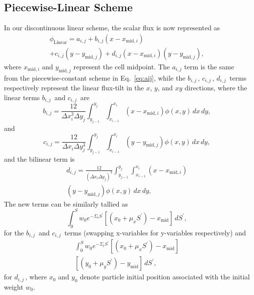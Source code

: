 \documentclass{anstrans}
\begin{document}
\subsection{Piecewise-Linear Scheme}
In our discontinuous linear scheme, the scalar flux is now represented as
\begin{multline} \label{eq:linear_scheme}
    \phi_{\mathrm{Linear}} = a_{i,j} + b_{i,j} (x-x_{\mathrm{mid},i}) 
    \\ 
    + c_{i,j} (y-y_{\mathrm{mid},j}) + d_{i,j} (x-x_{\mathrm{mid},i})(y-y_{\mathrm{mid},j}),
\end{multline}
where $x_{\mathrm{mid},i}$ and $y_{\mathrm{mid},j}$ represent the cell midpoint. The $a_{i,j}$ term is the same from the piecewise-constant scheme in Eq.~\ref{eq:aij}, while the $b_{i,j} \,$, $c_{i,j} \,$, $d_{i,j} \,$ terms respectively represent the linear flux-tilt in the $x$, $y$, and $xy$ directions, 
where the linear terms $b_{i,j} \,$ and $c_{i,j} \,$ are 
\begin{equation}
    b_{i,j} = \frac{12}{\Delta x_{i}^3 \Delta y_{j}} \int_{y_{j-1}}^{y_{j}}\int_{x_{i-1}}^{x_{i}} \left( x-x_{\mathrm{mid},i} \right)\phi(x,y) \, dx \, dy ,
\end{equation}
and
\begin{equation}
    c_{i,j} = \frac{12}{\Delta x_{i}\Delta y_{j}^3} \int_{y_{j-1}}^{y_{j}}\int_{x_{i-1}}^{x_{i}} \left( y-y_{\mathrm{mid},j} \right)\phi(x,y) \, dx \, dy , 
\end{equation}
and the bilinear term is 
\begin{multline}
    d_{i,j} = \frac{12}{(\Delta x_{i} \Delta y_{j})^3} \int_{y_{j-1}}^{y_{j}}\int_{x_{i-1}}^{x_{i}} \left( x-x_{\mathrm{mid},i} \right)
    \\
    \left( y-y_{\mathrm{mid},j} \right)\phi(x,y) \, dx \, dy , 
\end{multline}
The new terms can be similarly tallied as
\begin{equation}
     \int_{0}^{S} w_0 e^{-\Sigma_t S^\prime} \left[ \left(x_0 + \mu_x S^\prime\right)-x_\mathrm{mid} \right] \, dS^\prime, 
\end{equation}
for the $b_{i,j} \,$ and $c_{i,j} \,$ terms (swapping x-variables for y-variables respectively) and
\begin{multline}
     \int_{0}^{S} w_0 e^{-\Sigma_t S^\prime} \left[ \left(x_0 + \mu_x S^\prime\right)-x_\mathrm{mid} \right]
     \\
     \left[ \left(y_0 + \mu_y S^\prime\right)-y_\mathrm{mid} \right] \, dS^\prime, 
\end{multline}
for  $d_{i,j} \,$, where $x_0$ and $y_0$ denote particle initial position associated with the initial weight $w_0$.
\end{document}
